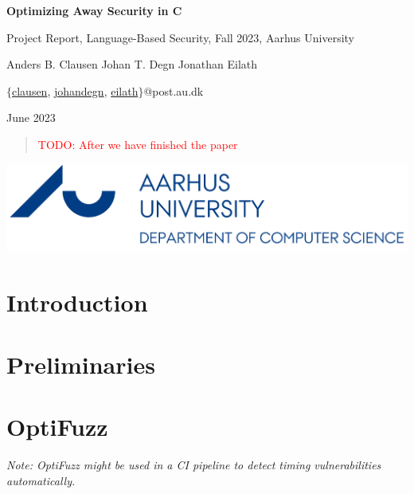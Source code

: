 \documentclass{article}
\newcommand\todo[1]{\textcolor{red}{TODO: #1}}
\begin{document}
\begin{titlepage}
  \vspace*{\fill}
  \begin{center}
    \huge
    \textbf{Optimizing Away Security in C}
        
    \vspace{0.2cm}
    \small
    Project Report, Language-Based Security, Fall 2023, Aarhus University
        
    \vspace{0.4cm}
    \large
    Anders B. Clausen \qquad Johan T. Degn \qquad Jonathan Eilath

    \vspace{0.2cm}
    \small
    $\{$\href{mailto:clausen@post.au.com}{clausen}, \href{mailto:johandegn@post.au.com}{johandegn}, \href{mailto:eilath@post.au.com}{eilath}$\}$@post.au.dk

    \vspace{0.4cm}
    June 2023
  \end{center}

  \begin{abstract}
    \todo{After we have finished the paper}
  \end{abstract}

  \vspace*{\fill}

  \begin{center}
    \includegraphics*[width=0.2\linewidth]{assets/au_logo.png}
  \end{center}
\end{titlepage}

\pagebreak

\tableofcontents

\pagebreak
{} 
\section{Introduction}


\section{Preliminaries}


\section{OptiFuzz}
\textit{Note: OptiFuzz might be used in a CI pipeline to detect timing vulnerabilities automatically.}
\end{document}
